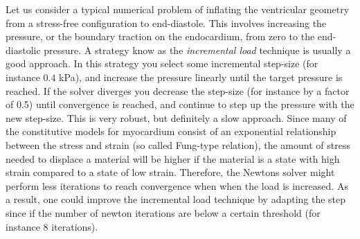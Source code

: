 Let us consider a
typical numerical problem of inflating the ventricular geometry from a
stress-free configuration to end-diastole. This involves increasing
the pressure, or the boundary traction on the endocardium, from zero
to the end-diastolic pressure. A strategy know as the
\emph{incremental load} technique is usually a good approach. In this
strategy you select some incremental step-size (for instance $0.4$
kPa), and increase the pressure linearly until the target pressure is
reached. If the solver diverges you decrease the step-size (for
instance by a factor of 0.5) until convergence is reached, and
continue to step up the pressure with the new step-size. This is very
robust, but definitely a slow approach. Since many of the 
constitutive models for myocardium consist of an exponential
relationship between the stress and strain (so called Fung-type
relation), the amount of stress needed to displace a material will be
higher if the material is a state with high strain compared to a state
of low strain. Therefore, the Newtons solver might perform less
iterations to reach convergence when when the load is increased. As a
result, one could improve the incremental load technique by adapting
the step since if the number of newton iterations are below a certain
threshold (for instance $8$ iterations).

